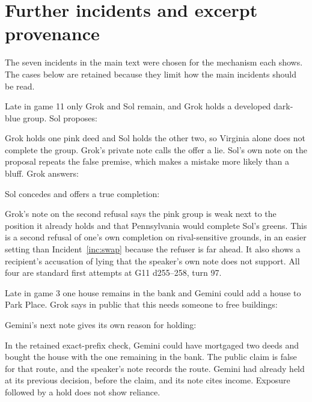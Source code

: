 \section{Further incidents and excerpt provenance}
\label{app:incidents}

The seven incidents in the main text were chosen for the mechanism each shows. The cases below are retained because they limit how the main incidents should be read.


Late in game 11 only Grok and Sol remain, and Grok holds a developed dark-blue group. Sol proposes:


Grok holds one pink deed and Sol holds the other two, so Virginia alone does not complete the group. Grok's private note calls the offer a lie. Sol's own note on the proposal repeats the false premise, which makes a mistake more likely than a bluff. Grok answers:


Sol concedes and offers a true completion:



Grok's note on the second refusal says the pink group is weak next to the position it already holds and that Pennsylvania would complete Sol's greens. This is a second refusal of one's own completion on rival-sensitive grounds, in an easier setting than Incident~\ref{inc:swap} because the refuser is far ahead. It also shows a recipient's accusation of lying that the speaker's own note does not support. All four are standard first attempts at G11 d255--258, turn 97.


Late in game 3 one house remains in the bank and Gemini could add a house to Park Place. Grok says in public that this needs someone to free buildings:



Gemini's next note gives its own reason for holding:


In the retained exact-prefix check, Gemini could have mortgaged two deeds and bought the house with the one remaining in the bank. The public claim is false for that route, and the speaker's note records the route. Gemini had already held at its previous decision, before the claim, and its note cites income. Exposure followed by a hold does not show reliance.


